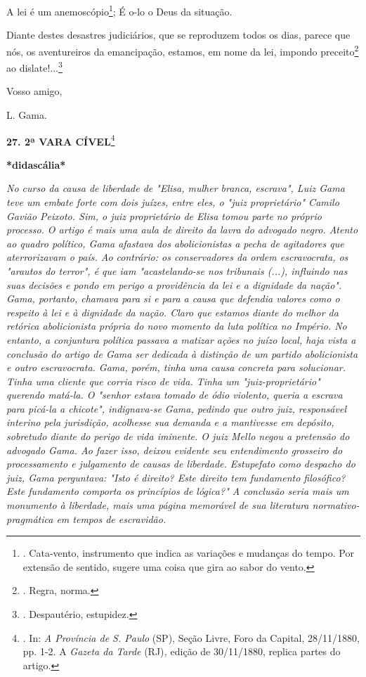 A lei é um anemoscópio\footnote{. Cata-vento, instrumento que indica as
  variações e mudanças do tempo. Por extensão de sentido, sugere uma
  coisa que gira ao sabor do vento.}; É o-lo o Deus da situação.

Diante destes desastres judiciários, que se reproduzem todos os dias,
parece que nós, os aventureiros da emancipação, estamos, em nome da lei,
impondo preceito\footnote{. Regra, norma.} ao dislate!...\footnote{.
  Despautério, estupidez.}

Vosso amigo,

L. Gama.

\textbf{27. 2ª VARA CÍVEL}\footnote{. In: \emph{A Província de S. Paulo}
  (SP), Seção Livre, Foro da Capital, 28/11/1880, pp. 1-2. A
  \emph{Gazeta da Tarde} (RJ)\emph{,} edição de 30/11/1880, replica
  partes do artigo.}

\textbf{*didascália*}

\emph{No curso da causa de liberdade de "Elisa, mulher branca, escrava",
Luiz Gama teve um embate forte com dois juízes, entre eles, o "juiz
proprietário" Camilo Gavião Peixoto. Sim, o juiz proprietário de Elisa
tomou parte no próprio processo. O artigo é mais uma aula de direito da
lavra do advogado negro. Atento ao quadro político, Gama afastava dos
abolicionistas a pecha de agitadores que aterrorizavam o país. Ao
contrário: os conservadores da ordem escravocrata, os "arautos do
terror", é que iam "acastelando-se nos tribunais (...), influindo nas
suas decisões e pondo em perigo a providência da lei e a dignidade da
nação". Gama, portanto, chamava para si e para a causa que defendia
valores como o respeito à lei e à dignidade da nação. Claro que estamos
diante do melhor da retórica abolicionista própria do novo momento da
luta política no Império. No entanto, a conjuntura política passava a
matizar ações no juízo local, haja vista a conclusão do artigo de Gama
ser dedicada à distinção de um partido abolicionista e outro
escravocrata. Gama, porém, tinha uma causa concreta para solucionar.
Tinha uma cliente que corria risco de vida. Tinha um "juiz-proprietário"
querendo matá-la. O "senhor estava tomado de ódio violento, queria a
escrava para picá-la a chicote", indignava-se Gama, pedindo que outro
juiz, responsável interino pela jurisdição, acolhesse sua demanda e a
mantivesse em depósito, sobretudo diante do perigo de vida iminente. O
juiz Mello negou a pretensão do advogado Gama. Ao fazer isso, deixou
evidente seu entendimento grosseiro do processamento e julgamento de
causas de liberdade. Estupefato como despacho do juiz, Gama perguntava:
"Isto é direito? Este direito tem fundamento filosófico? Este fundamento
comporta os princípios de lógica?" A conclusão seria mais um monumento à
liberdade, mais uma página memorável de sua literatura
normativo-pragmática em tempos de escravidão.}

